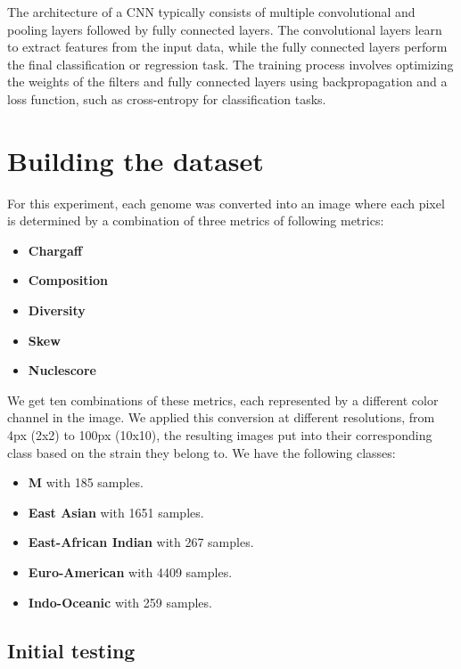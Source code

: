 The architecture of a CNN typically consists of multiple convolutional and pooling layers followed by fully connected layers.
The convolutional layers learn to extract features from the input data, while the fully connected layers perform the final classification
or regression task. The training process involves optimizing the weights of the filters and fully connected layers using backpropagation
and a loss function, such as cross-entropy for classification tasks.

\section{Building the dataset}
\label{sec:building_dataset}

For this experiment, each genome was converted into an image where each pixel is determined by a combination of three metrics of following
metrics:

\begin{itemize}
	\item \textbf{Chargaff}
	\item \textbf{Composition}
	\item \textbf{Diversity}
	\item \textbf{Skew}
	\item \textbf{Nuclescore}
\end{itemize}

We get ten combinations of these metrics, each represented by a different color channel in the image. We applied this conversion at different 
resolutions, from 4px (2x2) to 100px (10x10), the resulting images put into their corresponding class based on the strain they belong to. We 
have the following classes:

\begin{itemize}
	\item \textbf{M} with 185 samples.
	\item \textbf{East Asian} with 1651 samples.
	\item \textbf{East-African Indian} with 267 samples.
	\item \textbf{Euro-American} with 4409 samples.
	\item \textbf{Indo-Oceanic} with 259 samples.
\end{itemize}


\subsection{Initial testing}
\label{subsec:initial_testing}

